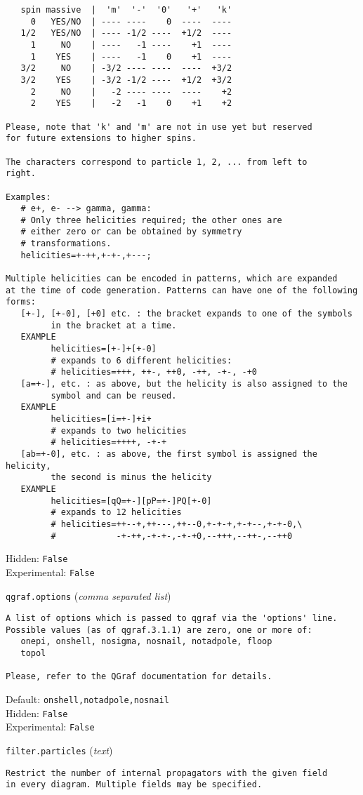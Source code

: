 \begin{basedescript}{\desclabelstyle{\pushlabel}}
\begin{verbatim}
   spin massive  |  'm'  '-'  '0'   '+'   'k'
     0   YES/NO  | ---- ----    0  ----  ----
   1/2   YES/NO  | ---- -1/2 ----  +1/2  ----
     1     NO    | ----   -1 ----    +1  ----
     1    YES    | ----   -1    0    +1  ----
   3/2     NO    | -3/2 ---- ----  ----  +3/2
   3/2    YES    | -3/2 -1/2 ----  +1/2  +3/2
     2     NO    |   -2 ---- ----  ----    +2
     2    YES    |   -2   -1    0    +1    +2

Please, note that 'k' and 'm' are not in use yet but reserved
for future extensions to higher spins.

The characters correspond to particle 1, 2, ... from left to
right.

Examples:
   # e+, e- --> gamma, gamma:
   # Only three helicities required; the other ones are
   # either zero or can be obtained by symmetry
   # transformations.
   helicities=+-++,+-+-,+---;

Multiple helicities can be encoded in patterns, which are expanded
at the time of code generation. Patterns can have one of the following
forms:
   [+-], [+-0], [+0] etc. : the bracket expands to one of the symbols
         in the bracket at a time.
   EXAMPLE
         helicities=[+-]+[+-0]
         # expands to 6 different helicities:
         # helicities=+++, ++-, ++0, -++, -+-, -+0
   [a=+-], etc. : as above, but the helicity is also assigned to the
         symbol and can be reused.
   EXAMPLE
         helicities=[i=+-]+i+
         # expands to two helicities
         # helicities=++++, -+-+
   [ab=+-0], etc. : as above, the first symbol is assigned the helicity,
         the second is minus the helicity
   EXAMPLE
         helicities=[qQ=+-][pP=+-]PQ[+-0]
         # expands to 12 helicities
         # helicities=++--+,++---,++--0,+-+-+,+-+--,+-+-0,\
         #            -+-++,-+-+-,-+-+0,--+++,--++-,--++0
\end{verbatim}
Hidden: \verb|False|
\\Experimental: \verb|False|
\\\item[\colorbox{gray!30}{\texttt{qgraf.options}}] (\textit{comma separated list})
\begin{verbatim}
A list of options which is passed to qgraf via the 'options' line.
Possible values (as of qgraf.3.1.1) are zero, one or more of:
   onepi, onshell, nosigma, nosnail, notadpole, floop
   topol

Please, refer to the QGraf documentation for details.
\end{verbatim}
Default: \verb|onshell,notadpole,nosnail|
\\Hidden: \verb|False|
\\Experimental: \verb|False|
\\\item[\colorbox{gray!30}{\texttt{filter.particles}}] (\textit{text})
\begin{verbatim}
Restrict the number of internal propagators with the given field
in every diagram. Multiple fields may be specified.


\end{verbatim}
\end{basedescript}
